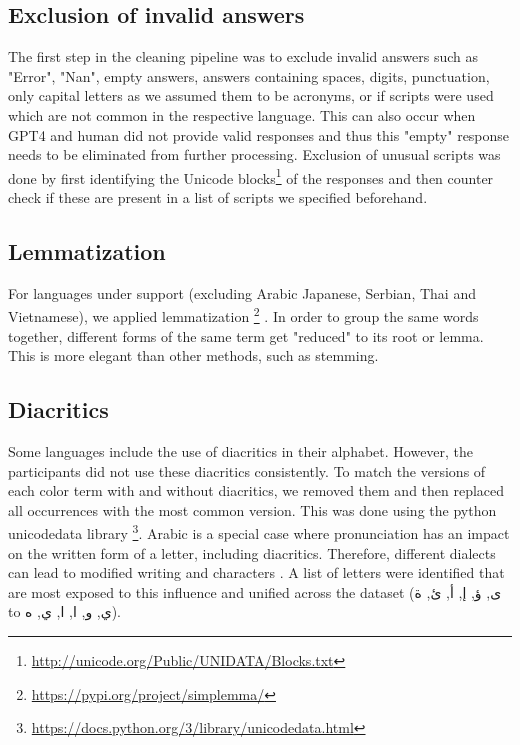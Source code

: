 \subsection{Exclusion of invalid answers}
The first step in the cleaning pipeline was to exclude invalid answers such as "Error", "Nan", empty answers, answers containing spaces, digits, punctuation, only capital letters as we assumed them to be acronyms, or if scripts were used which are not common in the respective language. This can also occur when GPT4 and human did not provide valid responses and thus this "empty" response needs to be eliminated from further processing.
Exclusion of unusual scripts was done by first identifying the Unicode blocks\footnote{\url{http://unicode.org/Public/UNIDATA/Blocks.txt}} of the responses and then counter check if these are present in a list of scripts we specified beforehand.

\subsection{Lemmatization}
For languages under support (excluding Arabic Japanese, Serbian, Thai and Vietnamese), we applied lemmatization \parencite{jurafskySpeech}\footnote{\url{https://pypi.org/project/simplemma/}} . In order to group the same words together, different forms of the same term get "reduced" to its root or lemma. This is more elegant than other methods, such as stemming.

\subsection{Diacritics}
Some languages include the use of diacritics in their alphabet.
However, the participants did not use these diacritics consistently. 
To match the versions of each color term with and without diacritics, we removed them and then replaced all occurrences with the most common version. 
This was done using the python unicodedata library \footnote{\url{https://docs.python.org/3/library/unicodedata.html}}.
Arabic is a special case where pronunciation has an impact on the written form of a letter, including diacritics. Therefore, different dialects can lead to modified writing and characters \parencite{owens2013oxford}. A list of letters were identified that are most exposed to this influence and unified across the dataset (\textarabic{ى, ؤ, إ, أ, ئ, ة} to \textarabic{ي, و, ا, ا, ي, ه}).


